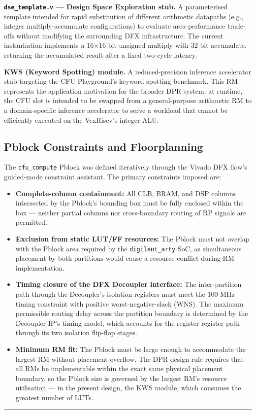 \textbf{\texttt{dse\_template.v} — Design Space Exploration stub.} A parameterised template intended for rapid substitution of different arithmetic datapaths (e.g., integer multiply-accumulate configurations) to evaluate area-performance trade-offs without modifying the surrounding DFX infrastructure. The current instantiation implements a 16×16-bit unsigned multiply with 32-bit accumulate, returning the accumulated result after a fixed two-cycle latency.

\textbf{KWS (Keyword Spotting) module.} A reduced-precision inference accelerator stub targeting the CFU Playground's keyword spotting benchmark. This RM represents the application motivation for the broader DPR system: at runtime, the CFU slot is intended to be swapped from a general-purpose arithmetic RM to a domain-specific inference accelerator to serve a workload that cannot be efficiently executed on the VexRiscv's integer ALU.

\subsection{Pblock Constraints and Floorplanning}

The \texttt{cfu\_compute} Pblock was defined iteratively through the Vivado DFX flow's guided-mode constraint assistant. The primary constraints imposed are:

\begin{itemize}
  \item \textbf{Complete-column containment:} All CLB, BRAM, and DSP columns intersected by the Pblock's bounding box must be fully enclosed within the box — neither partial columns nor cross-boundary routing of RP signals are permitted.
  \item \textbf{Exclusion from static LUT/FF resources:} The Pblock must not overlap with the Pblock area required by the \texttt{digilent\_arty} SoC, as simultaneous placement by both partitions would cause a resource conflict during RM implementation.
  \item \textbf{Timing closure of the DFX Decoupler interface:} The inter-partition path through the Decoupler's isolation registers must meet the 100 MHz timing constraint with positive worst-negative-slack (WNS). The maximum permissible routing delay across the partition boundary is determined by the Decoupler IP's timing model, which accounts for the register-register path through its two isolation flip-flop stages.
  \item \textbf{Minimum RM fit:} The Pblock must be large enough to accommodate the largest RM without placement overflow. The DPR design rule requires that all RMs be implementable within the exact same physical placement boundary, so the Pblock size is governed by the largest RM's resource utilisation — in the present design, the KWS module, which consumes the greatest number of LUTs.
\end{itemize}
\vspace{0.4em}\hrule\vspace{0.4em}

